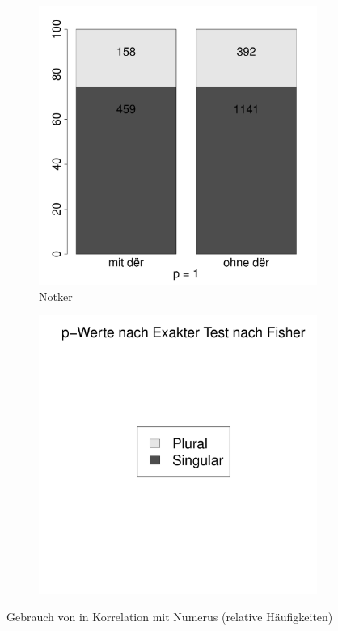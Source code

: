 \begin{figure}[p]
\begin{subfigure}[b]{.5\linewidth}
  \includegraphics[height=.25\textheight]{generated/images/numerus-notker}
\caption {Notker}
\end{subfigure}%
\begin{subfigure}[b]{.5\linewidth}
  \includegraphics[height=.25\textheight]{generated/images/numerus-legende}
\end{subfigure}

\caption{Gebrauch von  in Korrelation mit Numerus (relative Häufigkeiten)}
\label{fig:numerus}
\end{figure}

